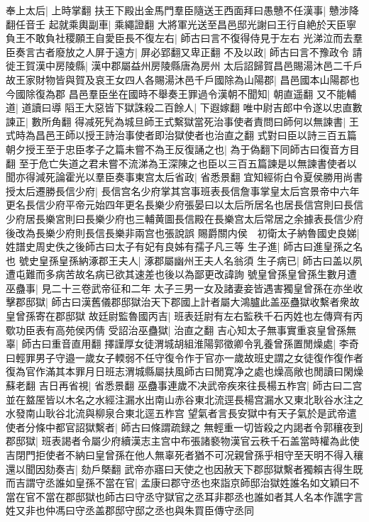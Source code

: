 奉上太后|{
	上時掌翻}
扶王下殿出金馬門羣臣隨送王西面拜曰愚戇不任漢事|{
	戇涉降翻任音壬}
起就乘輿副車|{
	乘繩證翻}
大將軍光送至昌邑邸光謝曰王行自絶於天臣寧負王不敢負社稷願王自愛臣長不復左右|{
	師古曰言不復得侍見于左右}
光涕泣而去羣臣奏言古者廢放之人屏于遠方|{
	屏必郢翻又卑正翻}
不及以政|{
	師古曰言不豫政令}
請徙王賀漢中房陵縣|{
	漢中郡屬益州房陵縣唐為房州}
太后詔歸賀昌邑賜湯沐邑二千戶故王家財物皆與賀及哀王女四人各賜湯沐邑千戶國除為山陽郡|{
	昌邑國本山陽郡也今國除復為郡}
昌邑羣臣坐在國時不舉奏王罪過令漢朝不聞知|{
	朝直遥翻}
又不能輔道|{
	道讀曰導}
䧟王大惡皆下獄誅殺二百餘人|{
	下遐嫁翻}
唯中尉吉郎中令遂以忠直數諫正|{
	數所角翻}
得减死髠為城旦師王式繫獄當死治事使者責問曰師何以無諫書|{
	王式時為昌邑王師以授王詩治事使者即治獄使者也治直之翻}
式對曰臣以詩三百五篇朝夕授王至于忠臣孝子之篇未嘗不為王反復誦之也|{
	為于偽翻下同師古曰復音方目翻}
至于危亡失道之君未嘗不流涕為王深陳之也臣以三百五篇諫是以無諫書使者以聞亦得減死論霍光以羣臣奏事東宫太后省政|{
	省悉景翻}
宜知經術白令夏侯勝用尚書授太后遷勝長信少府|{
	長信宫名少府掌其宫事班表長信詹事掌皇太后宫景帝中六年更名長信少府平帝元始四年更名長樂少府張晏曰以太后所居名也居長信宫則曰長信少府居長樂宮則曰長樂少府也三輔黄圖長信殿在長樂宫太后常居之余據表長信少府後改為長樂少府則長信長樂非兩宫也張說誤}
賜爵關内侯　初衛太子納魯國史良娣|{
	姓譜史周史佚之後師古曰太子有妃有良姊有孺子凡三等}
生子進|{
	師古曰進皇孫之名也}
號史皇孫皇孫納涿郡王夫人|{
	涿郡屬幽州王夫人名翁須}
生子病已|{
	師古曰盖以夙遭屯難而多病苦故名病已欲其速差也後以為鄙更改諱詢}
號皇曾孫皇曾孫生數月遭巫蠱事|{
	見二十三卷武帝征和二年}
太子三男一女及諸妻妾皆遇害獨皇曾孫在亦坐收擊郡邸獄|{
	師古曰漢舊儀郡邸獄治天下郡國上計者屬大鴻臚此盖巫蠱獄收繫者衆故皇曾孫寄在郡邸獄}
故廷尉監魯國丙吉|{
	班表廷尉有左右監秩千石丙姓也左傳齊有丙歜功臣表有高苑侯丙倩}
受詔治巫蠱獄|{
	治直之翻}
吉心知太子無事實重哀皇曾孫無辜|{
	師古曰重音直用翻}
擇謹厚女徒渭城胡組淮陽郭徵卿令乳養曾孫置閒燥處|{
	李奇曰輕罪男子守邉一歲女子輭弱不任守復令作于官亦一歲故班史謂之女徒復作復作者復為官作滿其本罪月日班志渭城縣屬扶風師古曰閒寛净之處也燥高敞也閒讀曰閑燥蘇老翻}
吉日再省視|{
	省悉景翻}
巫蠱事連歲不决武帝疾來往長楊五柞宫|{
	師古曰二宫並在盩厔皆以木名之水經注漏水出南山赤谷東北流逕長楊宫漏水又東北耿谷水注之水發南山耿谷北流與柳泉合東北逕五柞宫}
望氣者言長安獄中有天子氣於是武帝遣使者分條中都官詔獄繫者|{
	師古曰條謂疏録之}
無輕重一切皆殺之内謁者令郭穰夜到郡邸獄|{
	班表謁者令屬少府續漢志主宫中布張諸褻物漢官云秩千石盖當時權為此使}
吉閉門拒使者不納曰皇曾孫在他人無辜死者猶不可况親曾孫乎相守至天明不得入穰還以聞因劾奏吉|{
	劾戶槩翻}
武帝亦寤曰天使之也因赦天下郡邸獄繫者獨賴吉得生既而吉謂守丞誰如皇孫不當在官|{
	孟康曰郡守丞也來詣京師邸治獄姓誰名如文穎曰不當在官不當在郡邸獄也師古曰守丞守獄官之丞耳非郡丞也誰如者其人名本作譙字言姓又非也仲馮曰守丞盖郡邸守邸之丞也與朱買臣傳守丞同}
